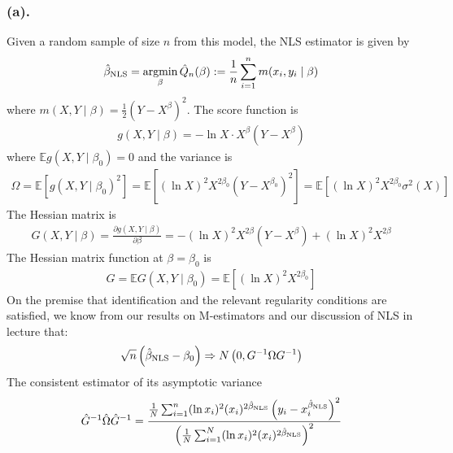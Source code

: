 \documentclass[11pt]{elegantbook}
\newcommand{\argmin}{\operatornamewithlimits{argmin}}
\begin{document}
\subsubsection*{(a).}
Given a random sample of size $n$ from this model, the NLS estimator is given by
\begin{equation}
    \begin{aligned}
        \hat{\beta}_\textnormal{NLS}=\argmin_\beta \hat{Q}_n(\beta):=\frac{1}{n}\sum_{i=1}^nm(x_i,y_i\mid \beta)
    \end{aligned}
    \nonumber
\end{equation}
where $m(X,Y\mid \beta)=\frac{1}{2}(Y-X^{\beta})^2$. The score function is
\begin{equation}
    \begin{aligned}
        g(X,Y\mid\beta)=-\ln X\cdot X^\beta(Y-X^\beta)
    \end{aligned}
    \nonumber
\end{equation}
where $\mathbb{E}g(X,Y\mid\beta_0)=0$ and the variance is
\begin{equation}
    \begin{aligned}
        \Omega=\mathbb{E}[g(X,Y\mid\beta_0)^2]=\mathbb{E}[(\ln X)^2 X^{2\beta_0}(Y-X^{\beta_0})^2]=\mathbb{E}[(\ln X)^2 X^{2\beta_0}\sigma^2(X)]
    \end{aligned}
    \nonumber
\end{equation}
The Hessian matrix is
\begin{equation}
    \begin{aligned}
        G(X,Y\mid\beta)=\frac{\partial g(X,Y\mid\beta)}{\partial \beta}=-(\ln X)^2 X^{2\beta}(Y-X^\beta)+(\ln X)^2 X^{2\beta}
    \end{aligned}
    \nonumber
\end{equation}
The Hessian matrix function at $\beta=\beta_0$ is
\begin{equation}
    \begin{aligned}
        G=\mathbb{E}G(X,Y\mid\beta_0)=\mathbb{E}[(\ln X)^2 X^{2\beta_0}]
    \end{aligned}
    \nonumber
\end{equation}
On the premise that identification and the relevant regularity conditions are satisfied, we know from our
results on M-estimators and our discussion of NLS in lecture that:
\begin{equation}
    \begin{aligned}
        \sqrt{n}\left(\hat{\beta}_\textnormal{NLS}-\beta_0\right) \Rightarrow N\left(0,G^{-1}\Omega G^{-1}\right)
    \end{aligned}
    \nonumber
\end{equation}
The consistent estimator of its asymptotic variance
\begin{equation}
    \begin{aligned}
        \hat{G}^{-1}\hat{\Omega}\hat{G}^{-1}=\frac{\frac{1}{N}\sum_{i=1}^n (\ln x_i)^2 (x_i)^{2\hat{\beta}_\textnormal{NLS}}\left(y_i-x_i^{\hat{\beta}_\textnormal{NLS}}\right)^2}{\left(\frac{1}{N}\sum_{i=1}^N(\ln x_i)^2(x_i)^{2\hat{\beta}_\textnormal{NLS}}\right)^2}
    \end{aligned}
    \nonumber
\end{equation}
\end{document}
